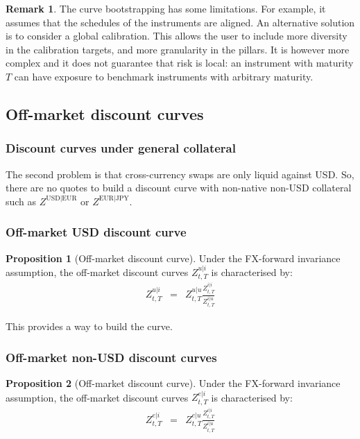 \documentclass[11pt,english]{amsart}
\theoremstyle{definition}
\newtheorem{prop}{Proposition}
\newtheorem{rema}{Remark}
\begin{document}
\begin{rema}
The curve bootstrapping has some limitations. For example, it assumes that the schedules of the instruments are aligned. An alternative solution is to consider a global calibration. This allows the user to include more diversity in the calibration targets, and more granularity in the pillars. It is however more complex and it does not guarantee that risk is local: an instrument with maturity $T$ can have exposure to benchmark instruments with arbitrary maturity.  
\end{rema}

\subsection{Off-market discount curves}%


\subsubsection{Discount curves under general collateral}
The second problem is that cross-currency swaps are only liquid against USD. So, there are no quotes to build a discount curve with non-native non-USD collateral such as $Z^{\mathrm{USD}|\mathrm{EUR}}$ or $Z^{\mathrm{EUR}|\mathrm{JPY}}$. 


\subsubsection{Off-market USD discount curve}

\begin{prop}[Off-market discount curve]
Under the FX-forward invariance assumption, the off-market discount curves $Z^{u|i}_{t,T}$ is characterised by:
\begin{eqnarray}
  Z^{u|i}_{t,T} &=& Z^{u|u}_{t,T} \frac{Z^{i|i}_{t,T}}{Z^{i|u}_{t,T}} 
  \label{eq:usd_off_market_discount_curve}
\end{eqnarray}
\end{prop}
This provides a way to build the curve.



\subsubsection{Off-market non-USD discount curves}


\begin{prop}[Off-market discount curve]
Under the FX-forward invariance assumption, the off-market discount curves $Z^{e|i}_{t,T}$ is characterised by:
\begin{eqnarray}
  Z^{e|i}_{t,T} &=& Z^{e|u}_{t,T} \frac{Z^{i|i}_{t,T}}{Z^{i|u}_{t,T}} 
  \label{eq:off_off_market_discount_curve}
\end{eqnarray}
\end{prop}
\end{document}

